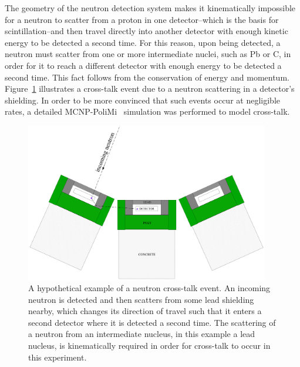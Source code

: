 The geometry of the neutron detection system makes it kinematically impossible for a neutron to scatter from a proton in one detector--which is the basis for scintillation--and then travel directly into another detector with enough kinetic energy to be detected a second time.
For this reason, upon being detected, a neutron must scatter from one or more intermediate nuclei, such as Pb or C, in order for it to reach a different detector with enough energy to be detected a second time.
This fact follows from the conservation of energy and momentum.
Figure~\ref{fig:CrossTalkExample} illustrates a cross-talk event due to a neutron scattering in a detector's shielding.
In order to be more convinced that such events occur at negligible rates, a detailed MCNP-PoliMi~\cite{MCNP_POLIMI} simulation was performed to model cross-talk.
\begin{figure}
    \centering
    \includegraphics[width = 0.95\textwidth]{Content/Errors/CrossTalkExample.png}
    \caption{A hypothetical example of a neutron cross-talk event.
An incoming neutron is detected and then scatters from some lead shielding nearby, which changes its direction of travel such that it enters a second detector where it is detected a second time.
The scattering of a neutron from an intermediate nucleus, in this example a lead nucleus, is kinematically required in order for cross-talk to occur in this experiment.}
    \label{fig:CrossTalkExample}
\end{figure}

